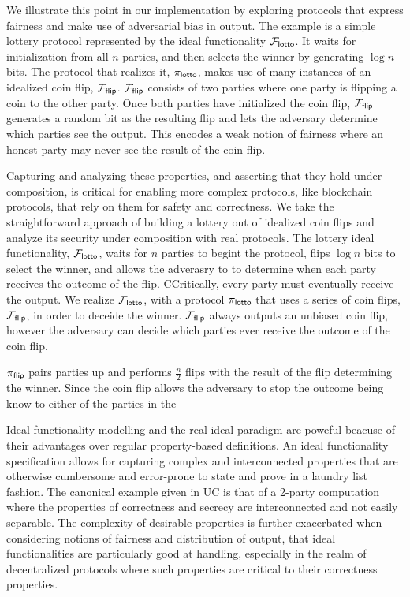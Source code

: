 \newcommand{\flotto}{\ensuremath{\F_\m{lotto}}\xspace}
\newcommand{\plotto}{\ensuremath{\pi_\m{lotto}}\xspace}
\newcommand{\fflip}{\ensuremath{\F_\m{flip}}\xspace}
\newcommand{\pflip}{\ensuremath{\pi_\m{flip}}\xspace}

We illustrate this point in our implementation by exploring protocols that express fairness and make use of adversarial bias in output.
The example is a simple lottery protocol represented by the ideal functionality \flotto. 
It waits for initialization from all $n$ parties, and then selects the winner by generating $\log n$ bits.
The protocol that realizes it, \plotto, makes use of many instances of an idealized coin flip, \fflip.
\fflip consists of two parties where one party is flipping a coin to the other party.
Once both parties have initialized the coin flip, \fflip generates a random bit as the resulting flip and lets the adversary determine which parties see the output.
This encodes a weak notion of fairness where an honest party may never see the result of the coin flip.



Capturing and analyzing these properties, and asserting that they hold under composition, is critical for enabling more complex protocols, like blockchain protocols, that rely on them for safety and correctness.
We take the straightforward approach of building a lottery out of idealized coin flips and analyze its security under composition with real protocols.
The lottery ideal functionality, \flotto, waits for $n$ parties to begint the protocol, flips $\log n$ bits to select the winner, and allows the adverasry to to determine when each party receives the outcome of the flip.
CCritically, every party must eventually receive the output. 
We realize \flotto, with a protocol \plotto that uses a series of coin flips, \fflip, in order to deceide the winner. 
\fflip always outputs an unbiased coin flip, however the adversary can decide which parties ever receive the outcome of the coin flip. 

\pflip pairs parties up and performs $\frac{n}{2}$ flips with the result of the flip determining the winner. 
Since the coin flip allows the adversary to stop the outcome being know to either of the parties in the 

Ideal functionality modelling and the real-ideal paradigm are poweful beacuse of their advantages over regular property-based definitions.
An ideal functionality specification allows for capturing complex and interconnected properties that are otherwise cumbersome and error-prone to state and prove in a laundry list fashion.
The canonical example given in UC is that of a 2-party computation where the properties of correctness and secrecy are interconnected and not easily separable.
The complexity of desirable properties is further exacerbated when considering notions of fairness and distribution of output, that ideal functionalities are particularly good at handling, especially in the realm of decentralized protocols where such properties are critical to their correctness properties.




